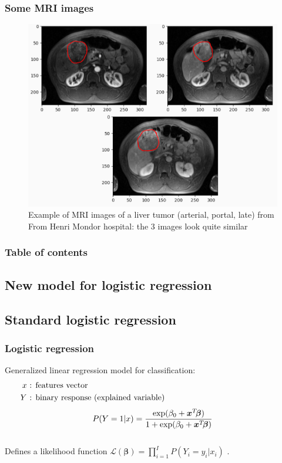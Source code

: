 \documentclass{beamer}
\begin{document}
\begin{frame}
    \frametitle{Some MRI images}
    \begin{figure}
        \centering
        \includegraphics[scale = 0.215]{images/HCC.png}
        \caption{Example of MRI images of a liver tumor (arterial, portal, late) from From Henri Mondor hospital: the 3 images look quite similar}
    \end{figure}
\end{frame}


\begin{frame}
    \frametitle{Table of contents}
    \tableofcontents
\end{frame}

\begin{frame}
    \section{New model for logistic regression}
\end{frame}

\subsection{Standard logistic regression}
\begin{frame}
    \frametitle{Logistic regression}
    Generalized linear regression model for classification:
    \begin{align}
    x &\text{ :  features vector} \hspace{5 cm} \phantom{1}\\
    Y &\text{ : binary response (explained variable)} \hspace{5 cm} \phantom{1}
\end{align}
$$P(Y = 1|x) = \frac{\exp(\beta_0 + \bm{x}^T\hspace{-2 pt}\bm{\beta})}{1 + \exp(\beta_0 + \bm{x}^T\hspace{-2 pt}\bm{\beta})}$$
\phantom{a}\\[10 pt]
    Defines a likelihood function $\mathcal{L}(\bm{\beta}) = \prod_{i = 1}^I P(Y_i = y_i|x_i)$ .

\end{frame}
\end{document}
